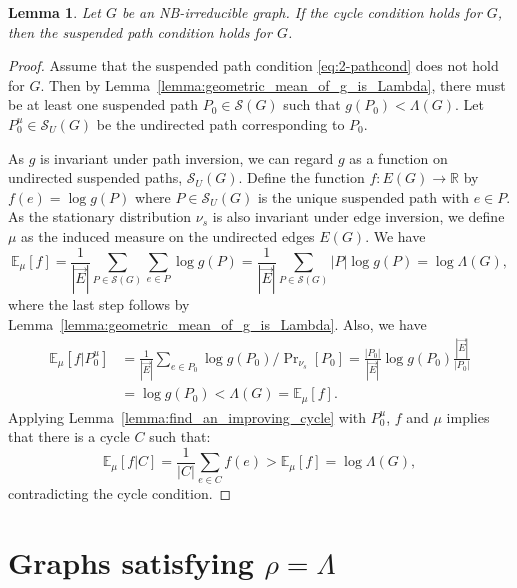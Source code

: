 \documentclass{article}
\newtheorem{lemma}[theorem]{Lemma}
\newcommand{\dirE}{\vec{E}}
\newcommand{\R}{\mathbb{R}}  %
\newcommand{\E}{\mathbb{E}} %
\begin{document}
\begin{lemma}
    Let $G$ be an NB-irreducible graph.
    If the cycle condition holds for $G$,
    then the suspended path condition holds for $G$.
\end{lemma}

\begin{proof}
    Assume that the suspended path condition \eqref{eq:2-pathcond} does not hold for $G$.
    Then by Lemma~\ref{lemma:geometric_mean_of_g_is_Lambda}, 
    there must be at least one suspended path $P_0 \in \mathcal{S}(G)$ such that $g(P_0)<\Lambda(G)$. 
    Let $P^u_0 \in \mathcal{S}_U(G)$ be the undirected path corresponding to $P_0$. 
    
    As $g$ is invariant under path inversion, we can regard $g$ as a function on undirected suspended paths, $\mathcal{S}_U(G)$. 
    Define the function $f:E(G)\to\R$ by $f(e)=\log g(P)$ where $P \in \mathcal{S}_U(G)$ is the unique suspended path with $e \in P$.
    As the stationary distribution $\nu_s$ is also invariant under edge inversion, we define $\mu$ as the induced measure on the undirected edges $E(G)$.
    We have 
    \begin{equation*}
        \E_\mu[f] = \frac{1}{|\dirE|} \sum_{P \in \mathcal{S}(G)} \sum_{e \in P} \log g(P) = \frac{1}{|\dirE|} \sum_{P \in \mathcal{S}(G)} |P| \log g(P) = \log \Lambda(G),
    \end{equation*}
    where the last step follows by Lemma~\ref{lemma:geometric_mean_of_g_is_Lambda}.
    Also, we have 
    \begin{align*}
        \E_\mu[f|P^u_0] 
        &= \frac{1}{|\dirE|} \sum_{e \in P_0} \log g(P_0) / \Pr\nolimits_{\nu_s}[P_0] 
        = \frac{|P_0|}{|\dirE|} \log g(P_0) \frac{|\dirE|}{|P_0|} \\
        &= \log g(P_0) 
        < \Lambda(G) 
        = \E_\mu[f].        
    \end{align*}
    Applying Lemma~\ref{lemma:find_an_improving_cycle} with $P^u_0$, $f$ and $\mu$ implies that there is a cycle $C$ such that:
    \begin{equation*}
          \E_\mu[f|C] = \frac{1}{|C|} \sum_{e \in C} f(e) > \E_\mu[f] = \log \Lambda(G),
    \end{equation*}
    contradicting the cycle condition.
\end{proof}


\section{Graphs satisfying $\rho = \Lambda$}\label{sect:graphs_with_rho_equal_lambda}
\end{document}
